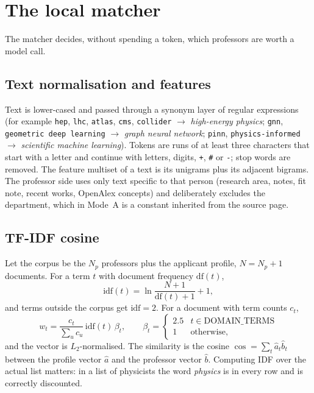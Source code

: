 \documentclass[11pt,a4paper]{article}
\newcommand{\code}[1]{\texttt{#1}}
\begin{document}
\section{The local matcher}\label{sec:matcher}

The matcher decides, without spending a token, which professors are worth a model call.

\subsection{Text normalisation and features}
Text is lower-cased and passed through a synonym layer of regular expressions (for example
\code{hep}, \code{lhc}, \code{atlas}, \code{cms}, \code{collider} $\to$ \emph{high-energy
physics}; \code{gnn}, \code{geometric deep learning} $\to$ \emph{graph neural network};
\code{pinn}, \code{physics-informed} $\to$ \emph{scientific machine learning}). Tokens are
runs of at least three characters that start with a letter and continue with letters, digits,
\code{+}, \code{\#} or \code{-}; stop words are removed. The feature multiset of a text is its
unigrams plus its adjacent bigrams. The professor side uses only text specific to that person
(research area, notes, fit note, recent works, OpenAlex concepts) and deliberately excludes the
department, which in Mode~A is a constant inherited from the source page.

\subsection{TF-IDF cosine}
Let the corpus be the $N_p$ professors plus the applicant profile, $N = N_p + 1$ documents. For a
term $t$ with document frequency $\mathrm{df}(t)$,
\[
  \mathrm{idf}(t) = \ln\frac{N + 1}{\mathrm{df}(t) + 1} + 1 ,
\]
and terms outside the corpus get $\mathrm{idf} = 2$. For a document with term counts $c_t$,
\[
  w_t = \frac{c_t}{\sum_u c_u}\,\mathrm{idf}(t)\,\beta_t, \qquad
  \beta_t = \begin{cases} 2.5 & t \in \text{DOMAIN\_TERMS} \\ 1 & \text{otherwise,}\end{cases}
\]
and the vector is $L_2$-normalised. The similarity is the cosine
$\cos = \sum_t \hat a_t \hat b_t$ between the profile vector $\hat a$ and the professor vector
$\hat b$. Computing IDF over the actual list matters: in a list of physicists the word
\emph{physics} is in every row and is correctly discounted.
\end{document}
